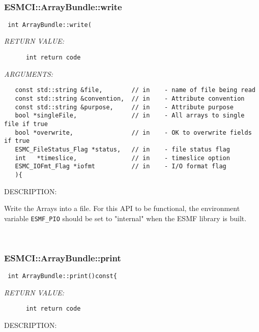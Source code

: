  
\mbox{}\hrulefill\
 
\subsubsection [ESMCI::ArrayBundle::write] {ESMCI::ArrayBundle::write}


  
\begin{verbatim} int ArrayBundle::write(\end{verbatim}{\em RETURN VALUE:}
\begin{verbatim}      int return code\end{verbatim}{\em ARGUMENTS:}
\begin{verbatim}   const std::string &file,        // in    - name of file being read
   const std::string &convention,  // in    - Attribute convention
   const std::string &purpose,     // in    - Attribute purpose
   bool *singleFile,               // in    - All arrays to single file if true
   bool *overwrite,                // in    - OK to overwrite fields if true
   ESMC_FileStatus_Flag *status,   // in    - file status flag
   int   *timeslice,               // in    - timeslice option
   ESMC_IOFmt_Flag *iofmt          // in    - I/O format flag
   ){\end{verbatim}
{\sf DESCRIPTION:\\ }


     Write the Arrays into a file. For this API to be functional,
     the environment variable {\tt ESMF\_PIO} should be set to "internal"
     when the ESMF library is built.
   
 
\mbox{}\hrulefill\
 
\subsubsection [ESMCI::ArrayBundle::print] {ESMCI::ArrayBundle::print}


  
\begin{verbatim} int ArrayBundle::print()const{\end{verbatim}{\em RETURN VALUE:}
\begin{verbatim}      int return code\end{verbatim}
{\sf DESCRIPTION:\\ }


